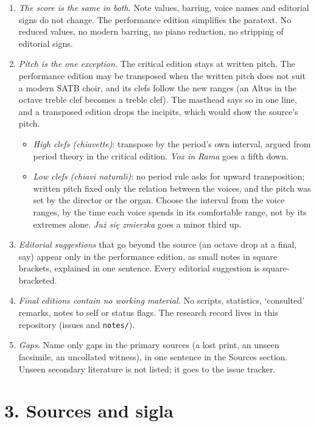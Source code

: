 \begin{enumerate}

\tightlist
\item
  \textit{The score is the same in both.} Note values, barring, voice names and editorial signs do not change. The performance edition simplifies the paratext. No reduced values, no modern barring, no piano reduction, no stripping of editorial signs.
\item
  \textit{Pitch is the one exception.} The critical edition stays at written pitch. The performance edition may be transposed when the written pitch does not suit a modern SATB choir, and its clefs follow the new ranges (an Altus in the octave treble clef becomes a treble clef). The masthead says so in one line, and a transposed edition drops the incipits, which would show the source's pitch.

  \begin{itemize}
  \tightlist
  \item
    \emph{High clefs (chiavette)}: transpose by the period's own interval, argued from period theory in the critical edition. \emph{Vox in Rama} goes a fifth down.
  \item
    \emph{Low clefs (chiavi naturali)}: no period rule asks for upward transposition; written pitch fixed only the relation between the voices, and the pitch was set by the director or the organ. Choose the interval from the voice ranges, by the time each voice spends in its comfortable range, not by its extremes alone. \emph{Już się zmierzka} goes a minor third up.
  \end{itemize}
\item
  \textit{Editorial suggestions} that go beyond the source (an octave drop at a final, say) appear only in the performance edition, as small notes in square brackets, explained in one sentence. Every editorial suggestion is square-bracketed.
\item
  \textit{Final editions contain no working material.} No scripts, statistics, ‘consulted’ remarks, notes to self or status flags. The research record lives in this repository (issues and \texttt{notes/}).
\item
  \textit{Gaps.} Name only gaps in the primary sources (a lost print, an unseen facsimile, an uncollated witness), in one sentence in the Sources section. Unseen secondary literature is not listed; it goes to the issue tracker.
\end{enumerate}

\section*{3. Sources and sigla}

